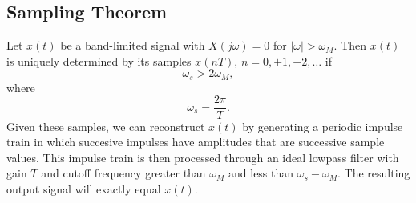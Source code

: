 \subsection{Sampling Theorem}
Let $x(t)$ be a band-limited signal with
$X(j\omega) = 0$ for $|\omega| > \omega_M$.
Then $x(t)$ is uniquely determined by its samples
$x(nT)$, $n = 0, \pm 1, \pm 2, \dots$ if
\begin{equation}
    \omega_s > 2 \omega_M,
\end{equation}
where
\begin{equation}
    \omega_s = \frac{2\pi}{T}.
\end{equation}
Given these samples, we can reconstruct
$x(t)$ by generating a periodic impulse
train in which succesive impulses have amplitudes that are
successive sample values. This impulse train is
then processed through an ideal lowpass filter
with gain $T$ and cutoff frequency greater than $\omega_M$ and
less than $\omega_s - \omega_M$.
The resulting output signal will exactly equal $x(t)$.